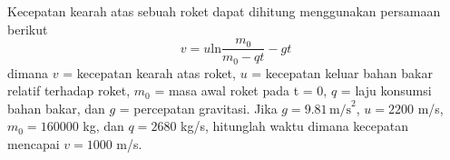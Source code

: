 \begin{soal}
Kecepatan kearah atas sebuah roket dapat dihitung menggunakan persamaan berikut
\begin{equation*}
v = u \mathrm{ln}\frac{m_{0}}{m_{0} - qt} - gt
\end{equation*}
dimana $v$ = kecepatan kearah atas roket,
$u$ = kecepatan keluar bahan bakar relatif terhadap
roket, $m_0 $ = masa awal roket pada t = 0, $q$ = laju konsumsi bahan bakar,
dan $g$ = percepatan gravitasi. Jika $g = 9.81 \, \mathrm{m/s}^2$,
$u = 2200$ m/s, $m_0 = 160000$ kg,
dan $q = 2680$ kg/s, hitunglah waktu
dimana kecepatan mencapai $v = 1000$ m/s.
\end{soal}